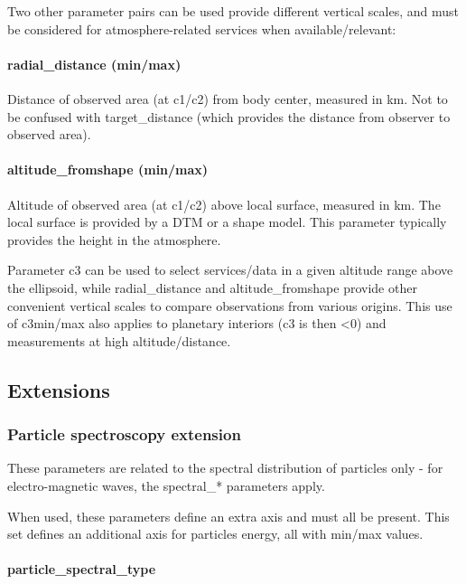 \documentclass[11pt,a4paper]{ivoa}
\begin{document}
Two other parameter pairs can be used provide different vertical scales, and must be considered for atmosphere-related services when available/relevant: \\

\paragraph{radial\_distance (min/max)}

Distance of observed area (at c1/c2) from body center, measured in km. Not to be confused with target\_distance (which provides the distance from observer to observed area). 

\paragraph{altitude\_fromshape (min/max)}

Altitude of observed area (at c1/c2) above local surface, measured in km. The local surface is provided by a DTM or a shape model. This parameter typically provides the height in the atmosphere.

Parameter c3 can be used to select services/data in a given altitude range above the ellipsoid, while radial\_distance and altitude\_fromshape provide other convenient vertical scales to compare observations from various origins. This use of c3min/max also applies to planetary interiors (c3 is then <0) and measurements at high altitude/distance. 

\subsection{Extensions}

\subsubsection{Particle spectroscopy extension}

These parameters are related to the spectral distribution of particles only - for electro-magnetic waves, the spectral\_* parameters apply.

When used, these parameters define an extra axis and must all be present. This set defines an additional axis for particles energy, all with min/max values.

\paragraph{particle\_spectral\_type}
\end{document}
